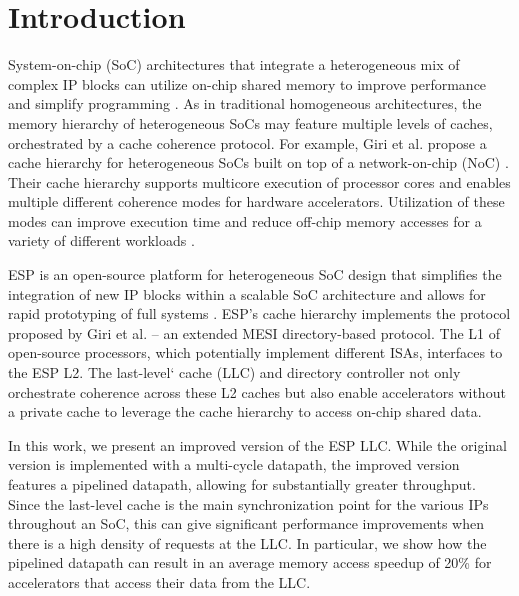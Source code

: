 \section{Introduction}
\label{sec:intro}

System-on-chip (SoC) architectures that integrate a heterogeneous mix of
complex IP blocks can utilize on-chip shared memory to improve performance and
simplify programming \cite{spandex, cohort, li2023duet, mantovani_cases16}.  As
in traditional homogeneous architectures, the memory hierarchy of heterogeneous
SoCs may feature multiple levels of caches, orchestrated by a cache coherence
protocol. For example, Giri et al. propose a cache hierarchy for heterogeneous
SoCs built on top of a network-on-chip (NoC) \cite{giri18}.  Their cache
hierarchy supports multicore execution of processor cores and enables multiple
different coherence modes for hardware accelerators.  Utilization of these
modes can improve execution time and reduce off-chip memory accesses for a
variety of different workloads \cite{giri_ieeemicro18, zuckerman_micro21}.

\par ESP is an open-source platform for heterogeneous SoC design that simplifies
the integration of new IP blocks within a scalable SoC architecture and allows
for rapid prototyping of full systems \cite{mantovani_iccad20}. ESP's cache
hierarchy implements the protocol proposed by Giri et al. -- an extended MESI
directory-based protocol.  The L1 of open-source processors, which potentially
implement different ISAs, interfaces to the ESP L2. The last-level` cache (LLC)
and directory controller not only orchestrate coherence across these L2 caches
but also enable accelerators without a private cache to leverage the cache
hierarchy to access on-chip shared data.

\par In this work, we present an improved version of the ESP LLC. While the
original version is implemented with a multi-cycle datapath, the improved
version features a pipelined datapath, allowing for substantially greater
throughput. Since the last-level cache is the main synchronization point for
the various IPs throughout an SoC, this can give significant performance
improvements when there is a high density of requests at the LLC. In
particular, we show how the pipelined datapath can result in an average memory
access speedup of 20\% for accelerators that access their data from the LLC.
